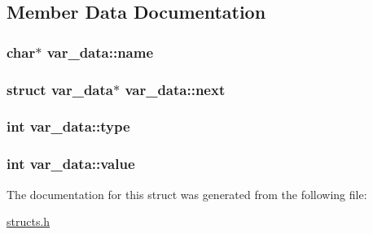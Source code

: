 \subsection{Member Data Documentation}
\hypertarget{structvar__data_a7a7b19b896fa8d73a4e51eceebd8126a}{
\subsubsection[{name}]{\setlength{\rightskip}{0pt plus 5cm}char$\ast$ var\-\_\-data\-::name}}\label{structvar__data_a7a7b19b896fa8d73a4e51eceebd8126a}
\hypertarget{structvar__data_a7f176b0bf237dc2dc8d6220c63f6de4c}{
\subsubsection[{next}]{\setlength{\rightskip}{0pt plus 5cm}struct {\bf var\-\_\-data}$\ast$ var\-\_\-data\-::next}}\label{structvar__data_a7f176b0bf237dc2dc8d6220c63f6de4c}
\hypertarget{structvar__data_a77da3718b382ccb4f1e2460628b0d197}{
\subsubsection[{type}]{\setlength{\rightskip}{0pt plus 5cm}int var\-\_\-data\-::type}}\label{structvar__data_a77da3718b382ccb4f1e2460628b0d197}
\hypertarget{structvar__data_af02c0ccc7bc097742a52e6c0f9d602c3}{
\subsubsection[{value}]{\setlength{\rightskip}{0pt plus 5cm}int var\-\_\-data\-::value}}\label{structvar__data_af02c0ccc7bc097742a52e6c0f9d602c3}


The documentation for this struct was generated from the following file\-:\begin{DoxyCompactItemize}
\item 
\hyperlink{structs_8h}{structs.\-h}\end{DoxyCompactItemize}
